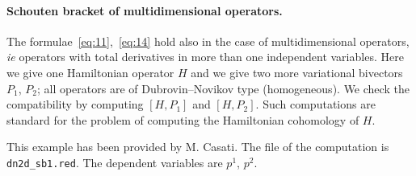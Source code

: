 \paragraph*{Schouten bracket of multidimensional operators.}
\label{cdesec:mult-oper}
The formulae~\eqref{eq:11},~\eqref{eq:14} hold also in the case of
multidimensional operators, \emph{ie} operators with total derivatives in more
than one independent variables. Here we give one Hamiltonian operator $H$ and we
give two more variational bivectors $P_1$, $P_2$; all operators are of
Dubrovin--Novikov type (homogeneous). We check the compatibility
by computing $[H,P_1]$ and $[H,P_2]$. Such computations are standard for the
problem of computing the Hamiltonian cohomology of $H$.

This example has been provided by M. Casati. The file of the computation is
\texttt{dn2d\_sb1.red}. The dependent variables are $p^1$, $p^2$.

